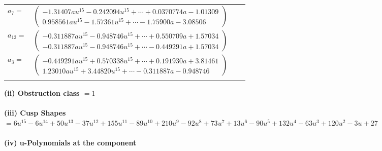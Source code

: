 \documentclass[1p]{elsarticle_modified}
\theoremstyle{definition}
\begin{document}
\begin{tabular}{m{7pt} m{180pt} m{7pt} m{180pt} }
\flushright $a_{7}=$&$\begin{pmatrix}-1.31407 a u^{15}-0.242094 u^{15}+\cdots+0.0370774 a-1.01309\\0.958561 a u^{15}-1.57361 u^{15}+\cdots-1.75900 a-3.08506\end{pmatrix}$ \\
\flushright $a_{12}=$&$\begin{pmatrix}-0.311887 a u^{15}-0.948746 u^{15}+\cdots+0.550709 a+1.57034\\-0.311887 a u^{15}-0.948746 u^{15}+\cdots-0.449291 a+1.57034\end{pmatrix}$ \\
\flushright $a_{3}=$&$\begin{pmatrix}-0.449291 a u^{15}+0.570338 u^{15}+\cdots+0.191930 a+3.81461\\1.23010 a u^{15}+3.44820 u^{15}+\cdots-0.311887 a-0.948746\end{pmatrix}$\\&\end{tabular}
\flushleft \textbf{(ii) Obstruction class $= 1$}\\~\\
\flushleft \textbf{(iii) Cusp Shapes $= 6 u^{15}-6 u^{14}+50 u^{13}-37 u^{12}+155 u^{11}-89 u^{10}+210 u^9-92 u^8+73 u^7+13 u^6-90 u^5+132 u^4-63 u^3+120 u^2-3 u+27$}\\~\\
\newpage\renewcommand{\arraystretch}{1}
\flushleft \textbf{(iv) u-Polynomials at the component}\newline \\
\end{document}
